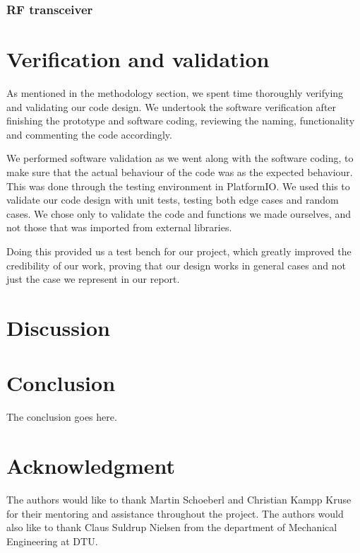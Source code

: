 \documentclass[conference]{IEEEtran}
\begin{document}
\subsubsection{RF transceiver}

\section{Verification and validation} %
As mentioned in the methodology section, we spent time thoroughly verifying and validating our code design. We undertook the software verification after finishing the prototype and software coding, reviewing the naming, functionality and commenting the code accordingly.

We performed software validation as we went along with the software coding, to make sure that the actual behaviour of the code was as the expected behaviour. This was done through the testing environment in PlatformIO. We used this to validate our code design with unit tests, testing both edge cases and random cases. We chose only to validate the code and functions we made ourselves, and not those that was imported from external libraries.

Doing this provided us a test bench for our project, which greatly improved the credibility of our work, proving that our design works in general cases and not just the case we represent in our report.

\section{Discussion}
% 

\section{Conclusion}
The conclusion goes here.



\section*{Acknowledgment}
The authors would like to thank Martin Schoeberl and Christian Kampp Kruse for their mentoring and assistance throughout the project. The authors would also like to thank Claus Suldrup Nielsen from the department of Mechanical Engineering at DTU.


\printbibliography
\end{document}
